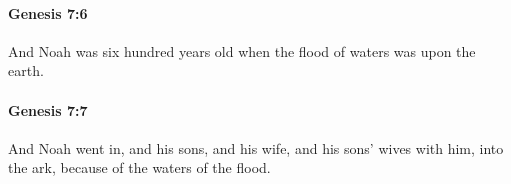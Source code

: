 		\paragraph{Genesis 7:6} %
			\label{GENESIS-7-6}

			And Noah was six hundred years old when the flood of waters was upon the earth.


		\paragraph{Genesis 7:7} %
			\label{GENESIS-7-7}

			And Noah went in, and his sons, and his wife, and his sons' wives with him, into the ark, because of the waters of the flood.



